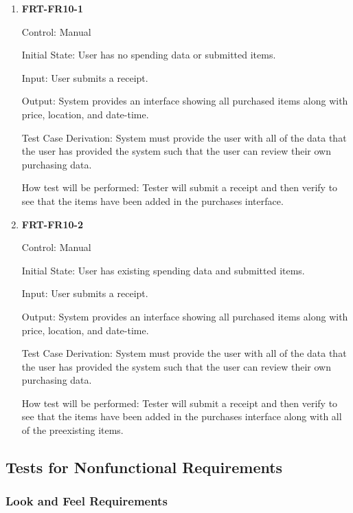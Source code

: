 \documentclass[12pt, titlepage]{article}
\begin{document}
\begin{enumerate}

\item{\textbf{FRT-FR10-1}}

Control: Manual
          
Initial State: User has no spending data or submitted items.

Input: User submits a receipt.
          
Output: System provides an interface showing all purchased items along with price, location, and date-time.

Test Case Derivation: System must provide the user with all of the data that the user has provided the system such that the user can review their own purchasing data.
          
How test will be performed: Tester will submit a receipt and then verify to see that the items have been added in the purchases interface.

\item{\textbf{FRT-FR10-2}}

Control: Manual
          
Initial State: User has existing spending data and submitted items.

Input: User submits a receipt.
          
Output: System provides an interface showing all purchased items along with price, location, and date-time.

Test Case Derivation: System must provide the user with all of the data that the user has provided the system such that the user can review their own purchasing data.
          
How test will be performed: Tester will submit a receipt and then verify to see that the items have been added in the purchases interface along with all of the preexisting items.

\end{enumerate}

\subsection{Tests for Nonfunctional Requirements}

\subsubsection{Look and Feel Requirements}
\end{document}
